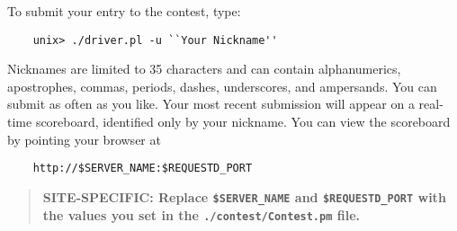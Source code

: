 \documentclass[11pt]{article}
\begin{document}
To submit your entry to the contest, type:
\begin{verbatim}
    unix> ./driver.pl -u ``Your Nickname''
\end{verbatim}
Nicknames are limited to 35 characters and can contain alphanumerics,
apostrophes, commas, periods, dashes, underscores, and ampersands.
You can submit as often as you like. Your most recent submission will
appear on a real-time scoreboard, identified only by your nickname.
You can view the scoreboard by pointing your browser at
\begin{verbatim}
    http://$SERVER_NAME:$REQUESTD_PORT
\end{verbatim}

\begin{quote}
\bf SITE-SPECIFIC: Replace \verb:$SERVER_NAME: and \verb:$REQUESTD_PORT:
with the values you set in the \verb:./contest/Contest.pm: file.
\end{quote}
\end{document}
